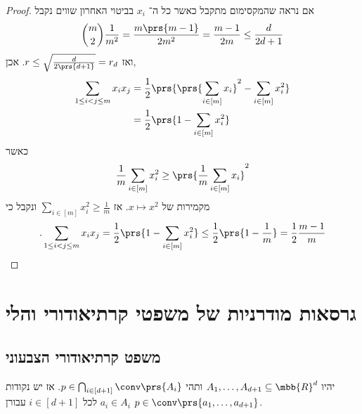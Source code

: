 \documentclass[a4paper,10pt,twoside,openany]{book}
\begin{document}
\begin{proof}
אם נראה שהמקסימום מתקבל כאשר כל ה־%
$x_i$
בביטוי האחרון שווים נקבל
\[\binom{m}{2} \frac{1}{m^2} = \frac{m\prs{m-1}}{2m^2} = \frac{m-1}{2m} \leq \frac{d}{2d+1}\]
ואז
$r \leq \sqrt{\frac{d}{2\prs{d+1}}} = r_d$.
אכן,
\begin{align*}
\sum_{1 \leq i < j \leq m} x_i x_j &= \frac{1}{2} \prs{\prs{\sum_{i \in [m]} x_i}^2 - \sum_{i \in [m]} x_i^2}
\\&= \frac{1}{2} \prs{1 - \sum_{i \in [m]} x_i^2}
\end{align*}
כאשר
\[\frac{1}{m} \sum_{i \in [m]} x_i^2 \geq \prs{\frac{1}{m} \sum_{i \in [m]} x_i}^2\]
מקמירות של
$x \mapsto x^2$.
אז
$\sum_{i \in [m]} x_i^2 \geq \frac{1}{m}$
ונקבל כי
\[\text{.} \sum_{1 \leq i < j \leq m} x_i x_j = \frac{1}{2} \prs{1 - \sum_{i \in [m]} x_i^2} \leq \frac{1}{2} \prs{1 - \frac{1}{m}} = \frac{1}{2} \frac{m-1}{m}\]
\end{proof}

\section{גרסאות מודרניות של משפטי קרתיאודורי והלי}

\subsection{משפט קרתיאודורי הצבעוני}

\begin{theorem}[קרתיאודורי]
יהיו
$A_1, \ldots, A_{d+1} \subseteq \mbb{R}^d$
ותהי
$p \in \bigcap_{i \in [d+1]} \conv\prs{A_i}$.
אז יש נקודות
$a_i \in A_i$
לכל
$i \in [d+1]$
עבורן
$p \in \conv\prs{a_1, \ldots, a_{d+1}}$.
\end{theorem}
\end{document}

